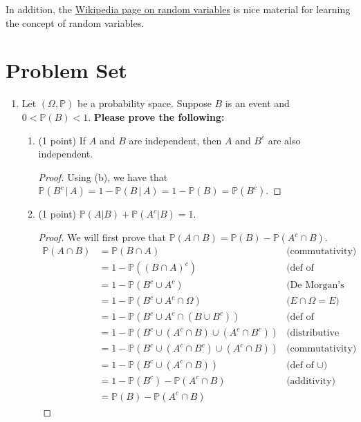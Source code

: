 \documentclass[11pt]{article}
\newcommand{\p}{\mathbb{P}}
\begin{document}
In addition, the \href{https://en.wikipedia.org/wiki/Random_variable}{Wikipedia page on random variables} is nice material for learning the concept of random variables.

\section{Problem Set}

\begin{enumerate}

\item Let $(\Omega,\mathbb{P})$ be a probability space. Suppose $B$ is an event and $0<\mathbb{P}(B)<1$. \textbf{Please prove the following:}
\begin{enumerate}
\item (1 point) If $A$ and $B$ are independent, then $A$ and $B^c$ are also independent. 

\begin{proof}
    Using (b), we have that \(\p(B^c\,|\,A)=1-\p(B\,|\,A)=1-\p(B)=\p(B^c)\).
\end{proof}

\item (1 point) $\mathbb{P}(A|B) + \mathbb{P}(A^c| B) = 1$.

\begin{proof}
    We will first prove that \(\p(A\cap B) = \p(B)-\p(A^c\cap B)\).
    \begin{align*}
        \p(A\cap B) &= \p(B\cap A) & \text{(commutativity)}\\
        &= 1-\p((B\cap A)^c) & \text{(def of complement)}\\
        &= 1-\p(B^c\cup A^c) & \text{(De Morgan's Law)}\\
        &= 1 - \p(B^c\cup A^c \cap \Omega) & \text{(\(E\cap\Omega = E\))}\\
        &= 1 - \p(B^c\cup A^c \cap (B\cup B^c)) & \text{(def of complement)}\\
        &= 1 - \p(B^c\cup (A^c\cap B)\cup (A^c\cap B^c)) &\text{(distributive law)}\\
        &= 1 - \p(B^c\cup (A^c\cap B^c)\cup (A^c\cap B)) & \text{(commutativity)}\\
        &= 1 - \p(B^c\cup (A^c\cap B)) & \text{(def of \(\cup\))}\\
        &= 1 - \p(B^c) - \p(A^c\cap B) & \text{(additivity)}\\
        &= \p(B) - \p(A^c\cap B)
    \end{align*}


\end{proof}
\end{enumerate}
\end{enumerate}
\end{document}
